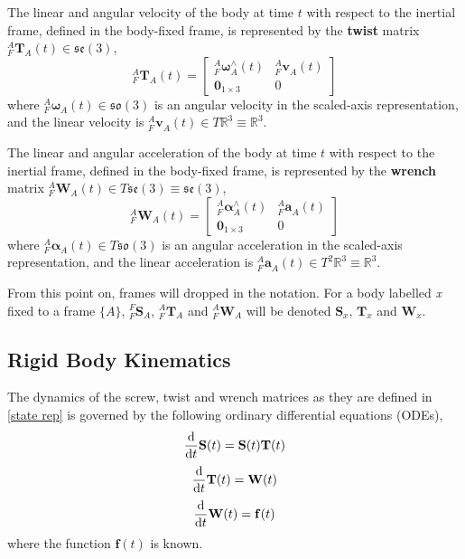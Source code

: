 		The linear and angular velocity of the body at time $t$ with respect to the inertial frame, defined in the body-fixed frame, is represented by the \textbf{twist} matrix ${^{A}_{F}\mathbf{T}^{}_{A}(t)} \in \mathfrak{se}(3)$,
		\begin{equation}
				{^{A}_{F}\mathbf{T}^{}_{A}(t)} = 
				\begin{bmatrix}
		  {^{A}_{F}\bm{\omega}^{\wedge}_{A}}(t) 	& 	^{A}_{F}\mathbf{v}^{}_{A}(t)\\
		  \textbf{0}_{1 \times 3} & 0						  
				\end{bmatrix}
		\end{equation}
		where $^{A}_{F}\bm{\omega}^{}_{A}(t) \in \mathfrak{so}(3)$ is an angular velocity in the scaled-axis representation, and the linear velocity is $^{A}_{F}\mathbf{v}^{}_{A}(t) \in T\mathbb{R}^3 \equiv \mathbb{R}^3$.
				
		The linear and angular acceleration of the body at time $t$ with respect to the inertial frame, defined in the body-fixed frame, is represented by the \textbf{wrench} matrix ${^{A}_{F}\mathbf{W}^{}_{A}(t)} \in T\mathfrak{se}(3) \equiv \mathfrak{se}(3)$,
		\begin{equation}
				{^{A}_{F}\mathbf{W}^{}_{A}(t)} = 
				\begin{bmatrix}
				  {^{A}_{F}\bm{\alpha}^{\wedge}_{A}}(t) 	& 	^{A}_{F}\mathbf{a}^{}_{A}(t)\\
				  \textbf{0}_{1 \times 3} & 0						  
				\end{bmatrix}
		\end{equation}
		where $^{A}_{F}\bm{\alpha}^{}_{A}(t) \in  T\mathfrak{so}(3)$ is an angular acceleration in the scaled-axis representation, and the linear acceleration is $^{A}_{F}\mathbf{a}^{}_{A}(t) \in T^2\mathbb{R}^3 \equiv \mathbb{R}^3$.
						
		From this point on, frames will dropped in the notation. For a body labelled \textit{x} fixed to a frame $\{A\}$, ${^{F}_{F}\mathbf{S}^{}_{A}}$, ${^{A}_{F}\mathbf{T}^{}_{A}}$ and ${^{A}_{F}\mathbf{W}^{}_{A}}$ will be denoted $\mathbf{S}_x$, $\mathbf{T}_x$ and $\mathbf{W}_x$.
						
	\subsection{Rigid Body Kinematics} \label{kinematics}
		The dynamics of the screw, twist and wrench matrices as they are defined in \ref{state rep} is governed by the following ordinary differential equations (ODEs),
		\begin{equation}
			{\frac{\textnormal{d}}{\textnormal{d}t}} \mathbf{S}(t) =\mathbf{S}(t)\mathbf{T}(t)
		\end{equation}		
		\begin{equation}
			{\frac{\textnormal{d}}{\textnormal{d}t}} \mathbf{T}(t) = \mathbf{W}(t)
		\end{equation}		
		\begin{equation}
			{\frac{\textnormal{d}}{\textnormal{d}t}} \mathbf{W}(t)=\mathbf{f}(t)			
		\end{equation}
		where the function $\mathbf{f}(t)$ is known.
		
